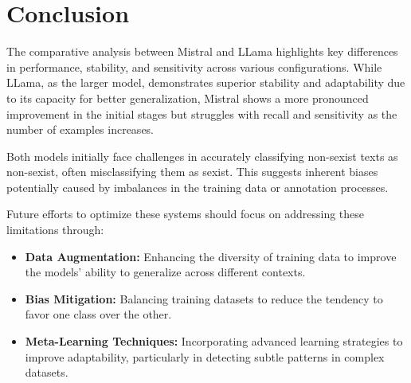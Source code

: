 \documentclass[11pt]{article}
\begin{document}



\section{Conclusion}
\label{sec:conclusion}


The comparative analysis between Mistral and LLama highlights key differences in performance, stability, and sensitivity across various configurations. While LLama, as the larger model, demonstrates superior stability and adaptability due to its capacity for better generalization, Mistral shows a more pronounced improvement in the initial stages but struggles with recall and sensitivity as the number of examples increases. 

Both models initially face challenges in accurately classifying non-sexist texts as non-sexist, often misclassifying them as sexist. This suggests inherent biases potentially caused by imbalances in the training data or annotation processes. 

Future efforts to optimize these systems should focus on addressing these limitations through:
\begin{itemize}
    \item \textbf{Data Augmentation:} Enhancing the diversity of training data to improve the models' ability to generalize across different contexts.
    \item \textbf{Bias Mitigation:} Balancing training datasets to reduce the tendency to favor one class over the other.
    \item \textbf{Meta-Learning Techniques:} Incorporating advanced learning strategies to improve adaptability, particularly in detecting subtle patterns in complex datasets.
\end{itemize}
\end{document}
